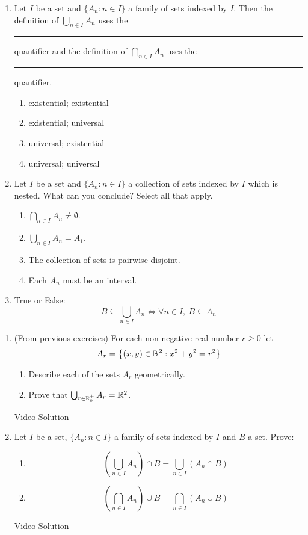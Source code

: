 \pagestyle{empty}


\begin{enumerate}
\item Let $I$ be a set and $\{A_n : n \in I\}$ a family of sets indexed by $I$. Then the definition of $\bigcup_{n \in I} A_n$ uses the \rule{2.5cm}{0.15mm} quantifier and the definition of $\bigcap_{n \in I} A_n$ uses the \rule{2.5cm}{0.15mm} quantifier.
\begin{enumerate}
    \item existential; existential
    \item existential; universal
    \item universal; existential
    \item universal; universal
\end{enumerate}

\item Let $I$ be a set and $\{A_n : n \in I\}$ a collection of sets indexed by $I$ which is nested. What can you conclude? Select all that apply.
\begin{enumerate}
    \item $\bigcap_{n \in I} A_n \neq \emptyset$.
    \item $\bigcup_{n \in I} A_n = A_1$.
    \item The collection of sets is pairwise disjoint.
    \item Each $A_n$ must be an interval.
\end{enumerate}

\item True or False:
\[
    B\subseteq \bigcup_{n\in I}A_n\iff \forall n\in I,\ B\subseteq A_n
\]
\end{enumerate}



\begin{enumerate}
\item (From previous exercises) For each non-negative real number $r\ge 0$ let 
  \[A_r=\big\{(x,y)\in\mathbb{R}^2:x^2+y^2=r^2\big\}\]
		\begin{enumerate}
  		\item Describe each of the sets $A_r$ geometrically.
  		\item Prove that $\bigcup_{r\in\mathbb{R}^+_0}A_r=\mathbb{R}^2$.
		\end{enumerate}
		
		\href{https://youtu.be/WuSucjuxjbU}{Video Solution}
		
\item Let $I$ be a set, $\{A_n : n \in I\}$ a family of sets indexed by $I$ and $B$ a set. Prove:
\begin{enumerate}
    \item \[ \left(\bigcup_{n \in I} A_n \right) \cap B = \bigcup_{n \in I} (A_n \cap B) \]
    \item \[ \left(\bigcap_{n \in I} A_n \right) \cup B = \bigcap_{n \in I} (A_n \cup B) \]
\end{enumerate}

\href{https://youtu.be/CtIg2lrsyAs}{Video Solution}
\end{enumerate}

